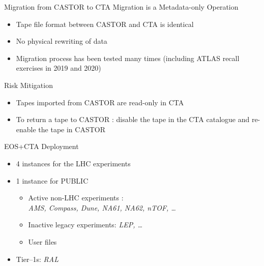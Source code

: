\documentclass[aspectratio=1610]{beamer}
\begin{document}
\begin{frame}{Migration from CASTOR to CTA}{}
   {\color{cern@blue}Migration is a Metadata-only Operation}
   \begin{itemize}
      \item Tape file format between CASTOR and CTA is identical
      \item No physical rewriting of data
      \item Migration process has been tested many times (including ATLAS recall exercises in 2019 and 2020)\\[1ex]
   \end{itemize}

   {\color{cern@blue}Risk Mitigation}
   \begin{itemize}
      \item Tapes imported from CASTOR are read-only in CTA
      \item To return a tape to CASTOR : disable the tape in the CTA catalogue and re-enable the tape in CASTOR
   \end{itemize}
\end{frame}

\begin{frame}{EOS+CTA Deployment}
   \begin{itemize}
      \item 4 instances for the LHC experiments
      \item 1 instance for PUBLIC
      \begin{itemize}
         \item Active non-LHC experiments :\\
            \textit{AMS, Compass, Dune, NA61, NA62, nTOF, \ldots}
         \item Inactive legacy experiments: \textit{LEP, \ldots}
         \item User files
      \end{itemize}
   \item Tier--1s: \textit{RAL}
   \end{itemize}
\end{frame}
\end{document}
